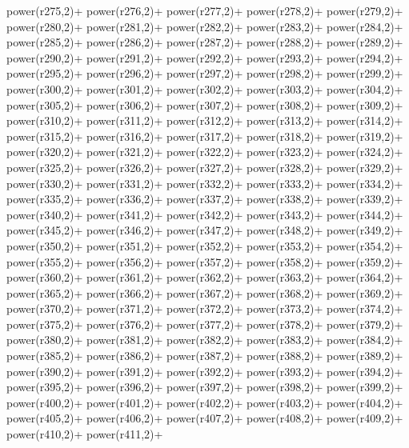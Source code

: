 \begin{DoxyCode}
{    power(r275,2)+
    power(r276,2)+
    power(r277,2)+
    power(r278,2)+
    power(r279,2)+
    power(r280,2)+
    power(r281,2)+
    power(r282,2)+
    power(r283,2)+
    power(r284,2)+
    power(r285,2)+
    power(r286,2)+
    power(r287,2)+
    power(r288,2)+
    power(r289,2)+
    power(r290,2)+
    power(r291,2)+
    power(r292,2)+
    power(r293,2)+
    power(r294,2)+
    power(r295,2)+
    power(r296,2)+
    power(r297,2)+
    power(r298,2)+
    power(r299,2)+
    power(r300,2)+
    power(r301,2)+
    power(r302,2)+
    power(r303,2)+
    power(r304,2)+
    power(r305,2)+
    power(r306,2)+
    power(r307,2)+
    power(r308,2)+
    power(r309,2)+
    power(r310,2)+
    power(r311,2)+
    power(r312,2)+
    power(r313,2)+
    power(r314,2)+
    power(r315,2)+
    power(r316,2)+
    power(r317,2)+
    power(r318,2)+
    power(r319,2)+
    power(r320,2)+
    power(r321,2)+
    power(r322,2)+
    power(r323,2)+
    power(r324,2)+
    power(r325,2)+
    power(r326,2)+
    power(r327,2)+
    power(r328,2)+
    power(r329,2)+
    power(r330,2)+
    power(r331,2)+
    power(r332,2)+
    power(r333,2)+
    power(r334,2)+
    power(r335,2)+
    power(r336,2)+
    power(r337,2)+
    power(r338,2)+
    power(r339,2)+
    power(r340,2)+
    power(r341,2)+
    power(r342,2)+
    power(r343,2)+
    power(r344,2)+
    power(r345,2)+
    power(r346,2)+
    power(r347,2)+
    power(r348,2)+
    power(r349,2)+
    power(r350,2)+
    power(r351,2)+
    power(r352,2)+
    power(r353,2)+
    power(r354,2)+
    power(r355,2)+
    power(r356,2)+
    power(r357,2)+
    power(r358,2)+
    power(r359,2)+
    power(r360,2)+
    power(r361,2)+
    power(r362,2)+
    power(r363,2)+
    power(r364,2)+
    power(r365,2)+
    power(r366,2)+
    power(r367,2)+
    power(r368,2)+
    power(r369,2)+
    power(r370,2)+
    power(r371,2)+
    power(r372,2)+
    power(r373,2)+
    power(r374,2)+
    power(r375,2)+
    power(r376,2)+
    power(r377,2)+
    power(r378,2)+
    power(r379,2)+
    power(r380,2)+
    power(r381,2)+
    power(r382,2)+
    power(r383,2)+
    power(r384,2)+
    power(r385,2)+
    power(r386,2)+
    power(r387,2)+
    power(r388,2)+
    power(r389,2)+
    power(r390,2)+
    power(r391,2)+
    power(r392,2)+
    power(r393,2)+
    power(r394,2)+
    power(r395,2)+
    power(r396,2)+
    power(r397,2)+
    power(r398,2)+
    power(r399,2)+
    power(r400,2)+
    power(r401,2)+
    power(r402,2)+
    power(r403,2)+
    power(r404,2)+
    power(r405,2)+
    power(r406,2)+
    power(r407,2)+
    power(r408,2)+
    power(r409,2)+
    power(r410,2)+
    power(r411,2)+
}
\end{DoxyCode}
